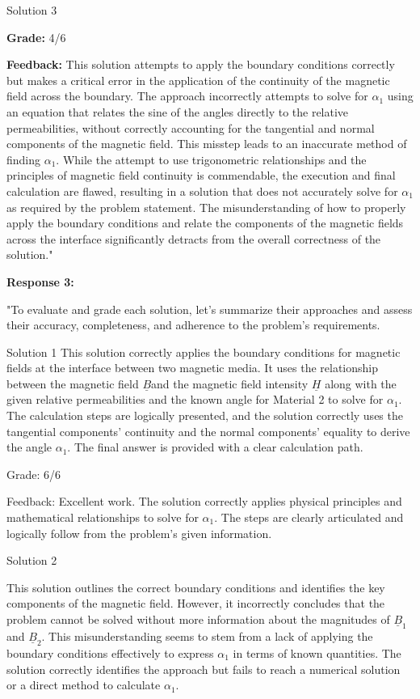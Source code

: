 \documentclass[a4paper,11pt]{article}
\begin{document}
Solution 3

\textbf{Grade:} 4/6

\textbf{Feedback:} This solution attempts to apply the boundary conditions correctly but makes a critical error in the application of the continuity of the magnetic field across the boundary. The approach incorrectly attempts to solve for \(\alpha_{1}\) using an equation that relates the sine of the angles directly to the relative permeabilities, without correctly accounting for the tangential and normal components of the magnetic field. This misstep leads to an inaccurate method of finding \(\alpha_{1}\). While the attempt to use trigonometric relationships and the principles of magnetic field continuity is commendable, the execution and final calculation are flawed, resulting in a solution that does not accurately solve for \(\alpha_{1}\) as required by the problem statement. The misunderstanding of how to properly apply the boundary conditions and relate the components of the magnetic fields across the interface significantly detracts from the overall correctness of the solution."

\textbf{Response 3:}

"To evaluate and grade each solution, let's summarize their approaches and assess their accuracy, completeness, and adherence to the problem's requirements.

Solution 1
This solution correctly applies the boundary conditions for magnetic fields at the interface between two magnetic media. It uses the relationship between the magnetic field \( \underline{B} \)and the magnetic field intensity \( \underline{H} \) along with the given relative permeabilities and the known angle for Material 2 to solve for \( \alpha_1 \). The calculation steps are logically presented, and the solution correctly uses the tangential components' continuity and the normal components' equality to derive the angle \( \alpha_1 \). The final answer is provided with a clear calculation path.

Grade: 6/6

Feedback: Excellent work. The solution correctly applies physical principles and mathematical relationships to solve for \( \alpha_1 \). The steps are clearly articulated and logically follow from the problem's given information.

Solution 2

This solution outlines the correct boundary conditions and identifies the key components of the magnetic field. However, it incorrectly concludes that the problem cannot be solved without more information about the magnitudes of 
\( \underline{B}_1 \) and \( \underline{B}_2 \). This misunderstanding seems to stem from a lack of applying the boundary conditions effectively to express \( \alpha_1 \) in terms of known quantities. The solution correctly identifies the approach but fails to reach a numerical solution or a direct method to calculate \( \alpha_1 \).
\end{document}
